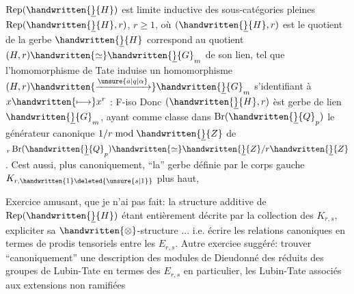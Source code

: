 $\operatorname{Rep}(\handwritten{\underline}{H})$ est limite inductive des sous-catégories pleines $\operatorname{Rep}(\handwritten{\underline}{H},r)$, $r\geq1$, où $(\handwritten{\underline}{H},r)$ est le quotient de la gerbe $\handwritten{\underline}{H}$ correspond au quotient $(H,r)\handwritten{\simeq}\handwritten{\underline}{G}_m$ de son lien, tel que l'homomorphisme de Tate  induise un homomorphisme $(H,r)\handwritten{\xrightarrow{\unsure{a|q|\alpha}}}\handwritten{\underline}{G}_m$ s'identifiant à $x\handwritten{\longmapsto}x^r$ : F-iso Donc $(\handwritten{\underline}{H},r)$  èst  gerbe de lien $\handwritten{\underline}{G}_m$, ayant comme classe dans $\operatorname{Br}(\handwritten{\underline}{Q}_p)$ le générateur canonique $1/r\bmod\handwritten{\underline}{Z}$ de ${}_r\operatorname{Br}(\handwritten{\underline}{Q}_p)\handwritten{\simeq}\handwritten{\underline}{Z}/r\handwritten{\underline}{Z}$. Cest aussi, plus canoniquement, ``la'' gerbe définie par le corps gauche $K_{r,\handwritten{1}\deleted{\unsure{s|1}}}$ plus haut, 

\handwritten{[}Exercice amusant, que je n'ai pas fait: la structure additive de $\operatorname{Rep}(\handwritten{\underline}{H})$ étant entièrement décrite par la collection des $K_{r,s}$, expliciter sa $\handwritten{\otimes}$-structure ... i.e. écrire les relations canoniques en termes de prodis tensoriels entre les $E_{r,s}$. Autre exerciee suggéré: trouver ``canoniquement'' une description des modules de Dieudonné des réduits des groupes de Lubin-Tate en termes des $E_{r,s}$  \handwritten{(}en particulier, les Lubin-Tate associés aux extensions non ramifiées
